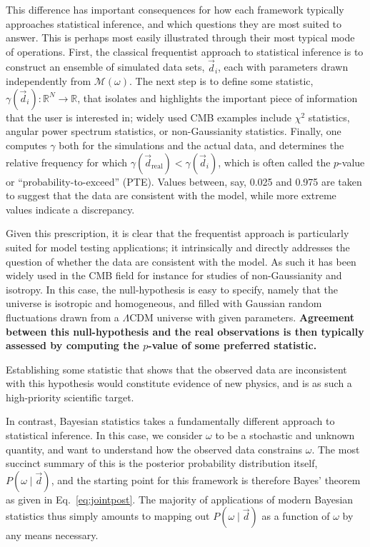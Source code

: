 \documentclass[twocolumn]{aa}%
\renewcommand{\d}[0]{\vec{d}}
\begin{document}
This difference has important consequences for how each framework
typically approaches statistical inference, and which questions they
are most suited to answer. This is perhaps most easily illustrated
through their most typical mode of operations. First, the classical
frequentist approach to statistical inference is to construct an
ensemble of simulated data sets, $\d_i$, each with parameters drawn
independently from $\mathcal{M}(\omega)$. The next step is to define
some statistic, $\gamma(\d_i): \mathbb{R}^N \rightarrow \mathbb{R}$,
that isolates and highlights the important piece of information that
the user is interested in; widely used CMB examples include $\chi^2$
statistics, angular power spectrum statistics, or non-Gaussianity
statistics. Finally, one computes $\gamma$ both for the simulations
and the actual data, and determines the relative frequency for which
$\gamma(\d_{\mathrm{real}}) < \gamma(\d_i)$, which is often called the
$p$-value or ``probability-to-exceed'' (PTE). Values between, say,
0.025 and 0.975 are taken to suggest that the data are consistent with
the model, while more extreme values indicate a discrepancy.

Given this prescription, it is clear that the frequentist approach is
particularly suited for model testing applications; it intrinsically
and directly addresses the question of whether the data are consistent
with the model. As such it has been widely used in the CMB field for
instance for studies of non-Gaussianity and isotropy. In this case,
the null-hypothesis is easy to specify, namely that the universe is
isotropic and homogeneous, and filled with Gaussian random
fluctuations drawn from a $\Lambda$CDM universe with given
parameters. {\bf Agreement between this null-hypothesis and the real
  observations is then typically assessed by computing the $p$-value
  of some preferred statistic.}

Establishing some statistic that shows that the observed
data are inconsistent with this hypothesis would constitute evidence
of new physics, and is as such a high-priority scientific target.

In contrast, Bayesian statistics takes a fundamentally different
approach to statistical inference. In this case, we consider $\omega$
to be a stochastic and unknown quantity, and want to understand how
the observed data constrains $\omega$. The most succinct summary of
this is the posterior probability distribution itself, $P(\omega\mid\d)$,
and the starting point for this framework is therefore Bayes' theorem
as given in Eq.~\eqref{eq:jointpost}. The majority of applications of
modern Bayesian statistics thus simply amounts to mapping out
$P(\omega\mid\d)$ as a function of $\omega$ by any means necessary.
\end{document}
